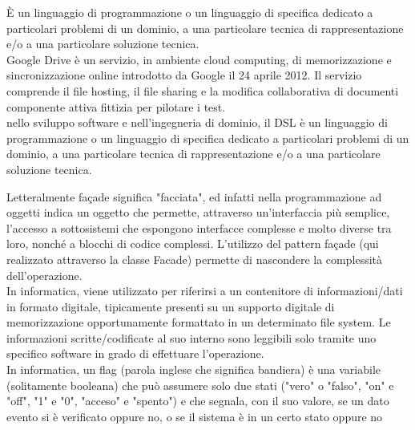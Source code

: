 \documentclass{scalatekids-article}
\begin{document}
 È un linguaggio di programmazione o un linguaggio di specifica dedicato a particolari problemi di un dominio, a una particolare tecnica di rappresentazione e/o a una particolare soluzione tecnica.
\\

 Google Drive è un servizio, in ambiente cloud computing, di memorizzazione e sincronizzazione online introdotto da Google il 24 aprile 2012. Il servizio comprende il file hosting, il file sharing e la modifica collaborativa di documenti
\\

 componente attiva fittizia per pilotare i test.
\\

 nello sviluppo software e nell'ingegneria di dominio, il DSL è un linguaggio di programmazione o un linguaggio di specifica dedicato a particolari problemi di un dominio, a una particolare tecnica di rappresentazione e/o a una particolare soluzione tecnica.
\\



 Letteralmente façade significa "facciata", ed infatti nella programmazione ad oggetti indica un oggetto che permette, attraverso un'interfaccia più semplice, l'accesso a sottosistemi che espongono interfacce complesse e molto diverse tra loro, nonché a blocchi di codice complessi.
L'utilizzo del pattern façade (qui realizzato attraverso la classe Facade) permette di nascondere la complessità dell'operazione. 
\\

 In informatica, viene utilizzato per riferirsi a un contenitore di informazioni/dati in formato digitale, tipicamente presenti su un supporto digitale di memorizzazione opportunamente formattato in un determinato file system.
Le informazioni scritte/codificate al suo interno sono leggibili solo tramite uno specifico software in grado di effettuare l'operazione.
\\

 In informatica, un flag (parola inglese che significa bandiera) è una variabile (solitamente booleana) che può assumere solo due stati ("vero" o "falso", "on" e "off", "1" e "0", "acceso" e "spento") e che segnala, con il suo valore, se un dato evento si è verificato oppure no, o se il sistema è in un certo stato oppure no
\\
\end{document}
